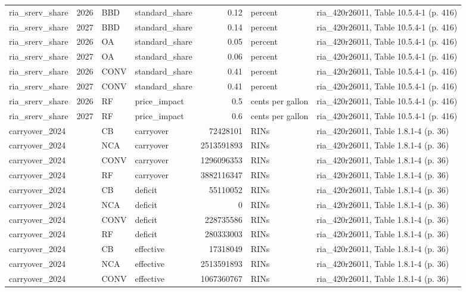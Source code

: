 \begin{longtable}{p{2.3cm}p{0.7cm}p{1.0cm}p{2.6cm}rp{1.7cm}p{4.6cm}}
ria\_srerv\_share & 2026 & BBD & standard\_share & 0.12 & percent & ria\_420r26011, Table 10.5.4-1 (p. 416) \\
ria\_srerv\_share & 2027 & BBD & standard\_share & 0.14 & percent & ria\_420r26011, Table 10.5.4-1 (p. 416) \\
ria\_srerv\_share & 2026 & OA & standard\_share & 0.05 & percent & ria\_420r26011, Table 10.5.4-1 (p. 416) \\
ria\_srerv\_share & 2027 & OA & standard\_share & 0.06 & percent & ria\_420r26011, Table 10.5.4-1 (p. 416) \\
ria\_srerv\_share & 2026 & CONV & standard\_share & 0.41 & percent & ria\_420r26011, Table 10.5.4-1 (p. 416) \\
ria\_srerv\_share & 2027 & CONV & standard\_share & 0.41 & percent & ria\_420r26011, Table 10.5.4-1 (p. 416) \\
ria\_srerv\_share & 2026 & RF & price\_impact & 0.5 & cents per gallon & ria\_420r26011, Table 10.5.4-1 (p. 416) \\
ria\_srerv\_share & 2027 & RF & price\_impact & 0.6 & cents per gallon & ria\_420r26011, Table 10.5.4-1 (p. 416) \\
carryover\_2024 &  & CB & carryover & 72428101 & RINs & ria\_420r26011, Table 1.8.1-4 (p. 36) \\
carryover\_2024 &  & NCA & carryover & 2513591893 & RINs & ria\_420r26011, Table 1.8.1-4 (p. 36) \\
carryover\_2024 &  & CONV & carryover & 1296096353 & RINs & ria\_420r26011, Table 1.8.1-4 (p. 36) \\
carryover\_2024 &  & RF & carryover & 3882116347 & RINs & ria\_420r26011, Table 1.8.1-4 (p. 36) \\
carryover\_2024 &  & CB & deficit & 55110052 & RINs & ria\_420r26011, Table 1.8.1-4 (p. 36) \\
carryover\_2024 &  & NCA & deficit & 0 & RINs & ria\_420r26011, Table 1.8.1-4 (p. 36) \\
carryover\_2024 &  & CONV & deficit & 228735586 & RINs & ria\_420r26011, Table 1.8.1-4 (p. 36) \\
carryover\_2024 &  & RF & deficit & 280333003 & RINs & ria\_420r26011, Table 1.8.1-4 (p. 36) \\
carryover\_2024 &  & CB & effective & 17318049 & RINs & ria\_420r26011, Table 1.8.1-4 (p. 36) \\
carryover\_2024 &  & NCA & effective & 2513591893 & RINs & ria\_420r26011, Table 1.8.1-4 (p. 36) \\
carryover\_2024 &  & CONV & effective & 1067360767 & RINs & ria\_420r26011, Table 1.8.1-4 (p. 36) \\

\end{longtable}
